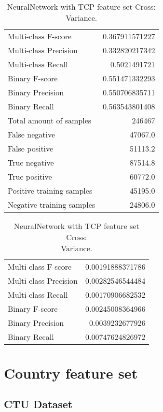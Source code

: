 \begin{table}[H]
\begin{minipage}{0.5\textwidth}
\caption{NeuralNetwork with TCP feature set Cross: \\Average.}
\centering
\begin{tabular}{l r}
\toprule
Multi-class F-score & 0.367911571227 \\
Multi-class Precision & 0.332820217342 \\
Multi-class Recall & 0.5021491721 \\
\midrule
Binary F-score & 0.551471332293 \\
Binary Precision & 0.550706835711 \\
Binary Recall & 0.563543801408 \\
\midrule
Total amount of samples & 246467 \\
False negative & 47067.0 \\
False positive & 51113.2 \\
True negative & 87514.8 \\
True positive & 60772.0 \\
\midrule
Positive training samples & 45195.0 \\
Negative training samples & 24806.0 \\
\bottomrule
\end{tabular}
\end{minipage}
\hfillx
\begin{minipage}{0.5\textwidth}
\caption{NeuralNetwork with TCP feature set Cross: \\Variance.}
\centering
\begin{tabular}{l r}
\toprule
Multi-class F-score & 0.00191888371786 \\
Multi-class Precision & 0.00282546544484 \\
Multi-class Recall & 0.00170906682532 \\
\midrule
Binary F-score & 0.00245008364966 \\
Binary Precision & 0.0039232677926 \\
Binary Recall & 0.00747624826972 \\
\bottomrule
\end{tabular}
\end{minipage}
\end{table}

\newpage
\section{Country feature set}
\subsection{CTU Dataset}


